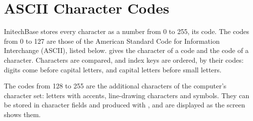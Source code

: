 \chapter{ASCII Character Codes}
\NoDictionaryHeads
InitechBase stores every character as a number from 0 to 255, its code.  The
codes from 0 to 127 are those of the American Standard Code for Information
Interchange (ASCII), listed below.   gives the character of a code and
 the code of a character.  Characters are compared, and index keys
are ordered, by their codes: digits come before capital letters, and capital
letters before small letters.

\begingroup\setlength\tabcolsep{4pt}
\noindent\hspace*{-\imHang}
\endgroup

The codes from 128 to 255 are the additional characters of the computer's
character set: letters with accents, line-drawing characters and symbols.
They can be stored in character fields and produced with , and are
displayed as the screen shows them.
